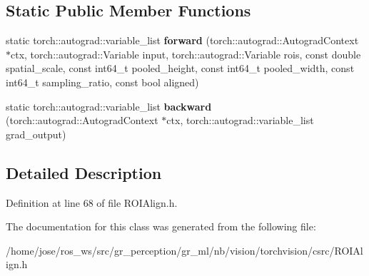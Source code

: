\subsection*{Static Public Member Functions}
\begin{DoxyCompactItemize}
\item 
\mbox{\label{classROIAlignFunction_afdbe7d36a7c32f81e6c09eba828e217e}} 
static torch\+::autograd\+::variable\+\_\+list {\bfseries forward} (torch\+::autograd\+::\+Autograd\+Context $\ast$ctx, torch\+::autograd\+::\+Variable input, torch\+::autograd\+::\+Variable rois, const double spatial\+\_\+scale, const int64\+\_\+t pooled\+\_\+height, const int64\+\_\+t pooled\+\_\+width, const int64\+\_\+t sampling\+\_\+ratio, const bool aligned)
\item 
\mbox{\label{classROIAlignFunction_a304e2e6b7002214690f6770149407694}} 
static torch\+::autograd\+::variable\+\_\+list {\bfseries backward} (torch\+::autograd\+::\+Autograd\+Context $\ast$ctx, torch\+::autograd\+::variable\+\_\+list grad\+\_\+output)
\end{DoxyCompactItemize}


\subsection{Detailed Description}


Definition at line 68 of file R\+O\+I\+Align.\+h.



The documentation for this class was generated from the following file\+:\begin{DoxyCompactItemize}
\item 
/home/jose/ros\+\_\+ws/src/gr\+\_\+perception/gr\+\_\+ml/nb/vision/torchvision/csrc/R\+O\+I\+Align.\+h\end{DoxyCompactItemize}
